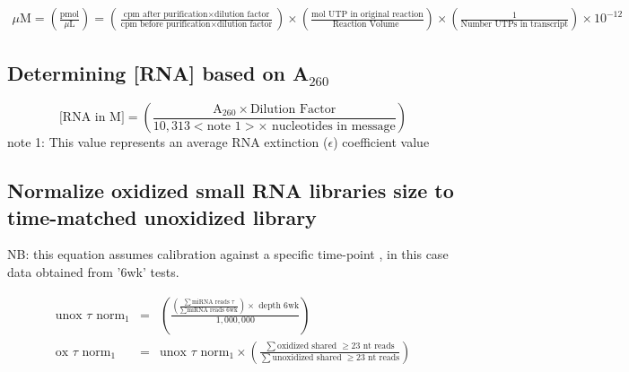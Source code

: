 {\tiny{
\begin{eqnarray*}
\mu \mbox{M} = \left( \frac{\mbox{pmol}}{\mu\mbox{L}}\right)
      = \left( \frac{\mbox{cpm after purification} \times \mbox{dilution factor}}{\mbox{cpm before purification} \times \mbox{dilution factor}} \right)
      \times \left( \frac{\mbox{mol UTP in original reaction}}{\mbox{Reaction Volume }} \right) \times \left( \frac{1}{\mbox{Number UTPs in transcript}} \right) \times 10^{-12} 
\end{eqnarray*}
}
}


\subsection{Determining [RNA] based on A$_{260}$}


$$
\mbox{[RNA in M]} = \left( \frac{\mbox{A}_{260} \times \mbox{Dilution Factor}}
                           {10,313 < \mbox{note 1}> \times \mbox{ nucleotides in message}} \right) 
$$
note 1: This value represents an average RNA extinction ($\epsilon$) coefficient value \\

\subsection{Normalize oxidized small RNA libraries size to time-matched unoxidized library}

NB: this equation assumes calibration against a specific time-point ,
in this case data obtained from '6wk' tests.

\begin{eqnarray*}
     \mbox{unox }\tau \mbox{ norm}_1 & = & \left(         
                        \frac{\left( \frac{\displaystyle\sum \mbox{miRNA reads } \tau}{\displaystyle \sum \mbox{miRNA reads 6wk} } \right) \times \mbox{ depth 6wk} }{1,000,000}              
                                          \right)\\
\mbox{ox }\tau \mbox{ norm}_1 & = &   \mbox{unox }\tau \mbox{ norm}_1 \times
                                 \left(
                                  \frac{\displaystyle \sum \mbox{oxidized shared } \ge \mbox{23 nt reads}}{\displaystyle \sum \mbox{unoxidized shared } \ge \mbox{23 nt reads}}
                                 \right)                                         
\end{eqnarray*}


